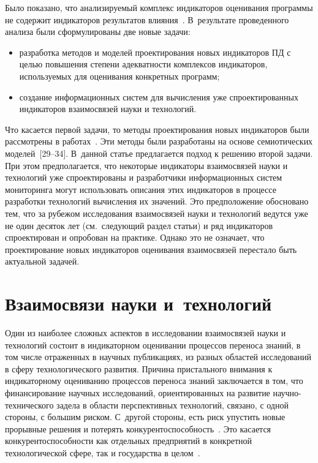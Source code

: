 \begin{multicols}{2}
      Было показано, что анализируемый комплекс индикаторов оценивания программы не 
содержит индикаторов результатов влияния~\cite{23-zat}. В~результате проведенного анализа 
были сформулированы две новые задачи:
      \begin{itemize}
\item разработка методов и моделей проектирования новых индикаторов ПД с целью 
повышения степени адекватности комплексов индикаторов, используемых для 
оценивания конкретных программ;
\item создание информационных систем для вычисления уже спроектированных 
индикаторов взаимосвязей науки и технологий.
\end{itemize}

      Что касается первой задачи, то методы проектирования новых индикаторов были 
рассмотрены в работах~\cite{27-zat, 28-zat}. Эти методы были разработаны на основе 
семиотических моделей~[29--34]. В~данной статье предлагается подход к решению второй 
задачи. При этом предполагается, что некоторые индикаторы взаимосвязей науки и технологий 
уже спроектированы и разработчики информационных систем мониторинга могут использовать 
описания этих индикаторов в процессе разработки технологий вычисления их значений. Это 
предположение обосновано тем, что за рубежом исследования взаимосвязей науки и 
технологий ведутся уже не один десяток лет (см.\ следующий раздел статьи) и ряд индикаторов 
спроектирован и опробован на практике. Однако это не означает, что проектирование новых 
индикаторов оценивания взаимосвязей перестало быть актуальной задачей.

\section{Взаимосвязи науки и~технологий}

    Один из наиболее сложных аспектов в исследовании взаимосвязей науки и технологий 
состоит в индикаторном оценивании процессов переноса знаний, в том числе отраженных в 
научных публикациях, из разных областей исследований в сферу технологического развития. 
Причина пристального внимания к индикаторному оцениванию процессов переноса знаний 
заключается в том, что финансирование научных исследований, ориентированных на развитие 
научно-технического задела в области перспективных технологий, связано, с одной стороны, с 
большим риском. С~другой стороны, есть риск упустить новые прорывные решения и потерять 
конкурентоспособность~\cite{35-zat}. Это касается конкурентоспособности как отдельных 
предприятий в конкретной технологической сфере, так и государства в целом~\cite{36-zat}.
    

\end{multicols}
